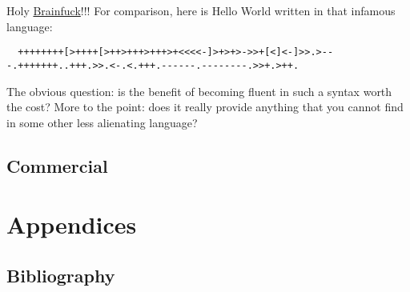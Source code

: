 \documentclass[reqno,12pt]{tufte-book}
\numberwithin{equation}{subsection}
\begin{document}
Holy \href{http://www.muppetlabs.com/~breadbox/bf/}{Brainfuck}!!!  For comparison, here is Hello World
written in that infamous language:

\begin{verbatim}
  ++++++++[>++++[>++>+++>+++>+<<<<-]>+>+>->>+[<]<-]>>.>---.+++++++..+++.>>.<-.<.+++.------.--------.>>+.>++.
\end{verbatim}

The obvious question: is the benefit of becoming fluent in such a
syntax worth the cost?  More to the point: does it really provide
anything that you cannot find in some other less alienating language?

\chapter{Commercial}




\clearpage
\part{Appendices}
\appendix
\begin{appendices}
\chapter{Bibliography}


\end{appendices}
\end{document}

